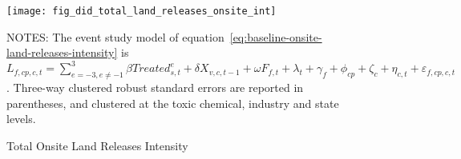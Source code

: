 \begin{figure}[H]
    \centering
    \texttt{[image: fig\_did\_total\_land\_releases\_onsite\_int]}
    \caption{Total Onsite Land Releases Intensity}
    \label{fig:baseline-onsite-land-releases-intensity}
    \begin{minipage}{18cm}
        \vspace{0.05in}
        NOTES: The event study model of equation~\ref{eq:baseline-onsite-land-releases-intensity} is $L_{f,cp,c,t} = \sum_{{e = -3},{e \neq -1}}^{3} \beta Treated_{s,t}^e + \delta X_{v,c,t-1} + \omega F_{f,t} + \lambda_{t} + \gamma_{f} + \phi_{cp} + \zeta_{c} + \eta_{c,t} + \varepsilon_{f,cp,c,t}$. Three-way clustered robust standard errors are reported in parentheses, and clustered at the toxic chemical, industry and state levels.
    \end{minipage}
\end{figure}